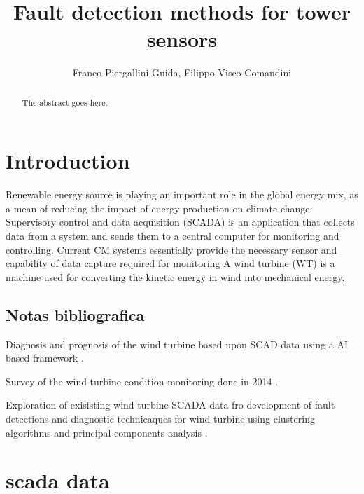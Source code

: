 \documentclass[journal]{IEEEtran}
\begin{document}
\title{Fault detection methods for tower sensors}

\author{Franco Piergallini Guida, Filippo Visco-Comandini}%



\maketitle

\begin{abstract}
The abstract goes here.
\end{abstract}
\section{Introduction}
Renewable energy source is playing an important role in the global energy mix, as a mean of reducing the impact of energy production on climate change. \\
Supervisory control and data acquisition (SCADA) is an application that collects data from a system and sends them to a central computer for monitoring and controlling. Current CM systems essentially provide the necessary sensor and capability of data capture required for monitoring
A wind turbine (WT) is a machine used for converting the kinetic energy in wind into mechanical energy. 
\subsection{Notas bibliografica}
Diagnosis and prognosis of the wind turbine based upon SCAD data using a AI based framework \cite{wang2014scada}.

\cite{kusiak2011prediction}

\cite{lu2009review}

\cite{schlechtingen2012condition}

\cite{schlechtingen2011comparative}

\cite{yang2014wind}
Survey of the wind turbine condition monitoring done in 2014 \cite{tchakoua2014wind}.


\cite{wymore2015survey}

Exploration of exisisting wind turbine SCADA data fro development of fault detections and diagnostic technicaques for wind turbine using clustering algorithms and principal components analysis \cite{kim2011use}.

\section{scada data}
\end{document}
